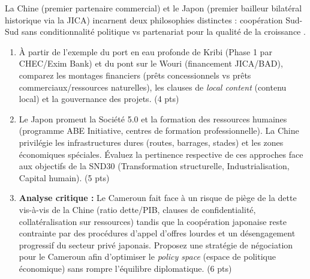 \documentclass[11pt]{article}
\begin{document}
\begin{exercice}
La Chine (premier partenaire commercial) et le Japon (premier bailleur bilatéral historique via la JICA) incarnent deux philosophies distinctes : \og coopération Sud-Sud sans conditionnalité politique \fg vs \og partenariat pour la qualité de la croissance \fg.
\begin{enumerate}
    \item À partir de l'exemple du port en eau profonde de Kribi (Phase 1 par CHEC/Exim Bank) et du pont sur le Wouri (financement JICA/BAD), comparez les montages financiers (prêts concessionnels vs prêts commerciaux/ressources naturelles), les clauses de \og \textit{local content} \fg (contenu local) et la gouvernance des projets. (4 pts)
    \item Le Japon promeut la \og Société 5.0 \fg et la formation des ressources humaines (programme ABE Initiative, centres de formation professionnelle). La Chine privilégie les infrastructures \og dures \fg (routes, barrages, stades) et les zones économiques spéciales. Évaluez la pertinence respective de ces approches face aux objectifs de la SND30 (Transformation structurelle, Industrialisation, Capital humain). (5 pts)
    \item \textbf{Analyse critique :} Le Cameroun fait face à un risque de \og piège de la dette \fg vis-à-vis de la Chine (ratio dette/PIB, clauses de confidentialité, collatéralisation sur ressources) tandis que la coopération japonaise reste contrainte par des procédures d'appel d'offres lourdes et un désengagement progressif du secteur privé japonais. Proposez une stratégie de négociation pour le Cameroun afin d'optimiser le \og \textit{policy space} \fg (espace de politique économique) sans rompre l'équilibre diplomatique. (6 pts)
\end{enumerate}
\end{exercice}
\end{document}
